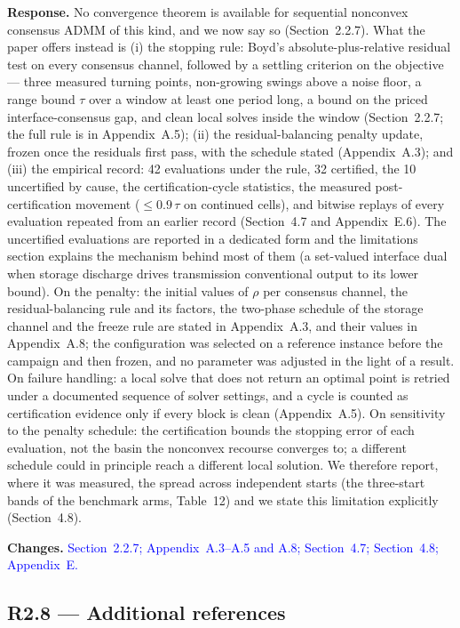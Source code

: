 \documentclass[11pt]{article}
\newcommand{\rresponse}[1]{\noindent\textbf{Response.} #1\par\smallskip}
\newcommand{\rchanges}[1]{\noindent\textbf{Changes.} \textcolor{blue}{#1}\par\medskip}
\begin{document}
\rresponse{No convergence theorem is available for sequential nonconvex consensus ADMM of this kind, and we
now say so (Section~2.2.7). What the paper offers instead is (i) the stopping rule: Boyd's absolute-plus-relative
residual test on every consensus channel, followed by a settling criterion on the objective --- three
measured turning points, non-growing swings above a noise floor, a range bound $\tau$ over a window at
least one period long, a bound on the priced interface-consensus gap, and clean local solves inside the
window (Section~2.2.7; the full rule is in Appendix~A.5); (ii) the residual-balancing penalty update, frozen once the residuals first pass,
with the schedule stated (Appendix~A.3); and (iii) the empirical record: 42 evaluations under the rule, 32
certified, the 10 uncertified by cause, the certification-cycle statistics, the measured
post-certification movement ($\le 0.9\,\tau$ on continued cells), and bitwise replays of every evaluation
repeated from an earlier record (Section~4.7 and Appendix~E.6). The uncertified evaluations are reported in a dedicated form and
the limitations section explains the mechanism behind most of them (a set-valued interface dual when
storage discharge drives transmission conventional output to its lower bound). On the penalty: the
initial values of $\rho$ per consensus channel, the residual-balancing rule and its factors, the two-phase
schedule of the storage channel and the freeze rule are stated in Appendix~A.3, and their values in Appendix~A.8; the configuration was
selected on a reference instance before the campaign and then frozen, and no parameter was adjusted in
the light of a result. On failure handling: a local solve that does not return an optimal point is retried
under a documented sequence of solver settings, and a cycle is counted as certification evidence only if
every block is clean (Appendix~A.5). On sensitivity to the penalty schedule: the certification bounds the
stopping error of each evaluation, not the basin the nonconvex recourse converges to; a different
schedule could in principle reach a different local solution. We therefore report, where it was measured,
the spread across independent starts (the three-start bands of the benchmark arms, Table~12) and we
state this limitation explicitly (Section~4.8).}
\rchanges{Section~2.2.7; Appendix~A.3--A.5 and A.8; Section~4.7; Section~4.8; Appendix~E.}

\subsection*{R2.8 --- Additional references}
\end{document}
